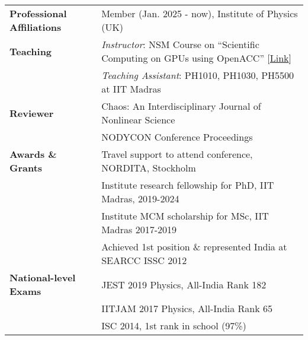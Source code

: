 \begin{longtable}[l]{@{} m{4.75cm} m{13cm}}

\textbf{Professional Affiliations} & Member (Jan. 2025 - now), Institute of Physics (UK)\\[0.3cm]

\textbf{Teaching} & \textit{Instructor}: NSM Course on ``Scientific Computing on GPUs using OpenACC'' [\href{https://www.cse.iitm.ac.in/~rupesh/events/openacc23/}{Link}]\\ 
& \textit{Teaching Assistant}: PH1010, PH1030, PH5500 at IIT Madras\\[0.3cm]

\textbf{Reviewer} & Chaos: An Interdisciplinary Journal of Nonlinear Science \\
                                    & NODYCON Conference Proceedings \\ [0.3cm]

\textbf{Awards \& Grants} & Travel support to attend conference, NORDITA, Stockholm\\
                                         & Institute research fellowship for PhD, IIT Madras, 2019-2024\\
                                         & Institute MCM scholarship for MSc, IIT Madras 2017-2019\\
                                         & Achieved 1st position \& represented India at SEARCC ISSC 2012\\[0.3cm]

\textbf{National-level Exams} & JEST 2019 Physics, All-India Rank 182\\
                                                & IITJAM 2017 Physics, All-India Rank 65\\
                                                & ISC 2014, 1st rank in school (97\%)
\end{longtable}